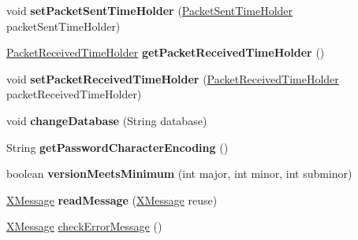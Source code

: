 \begin{DoxyCompactItemize}
void {\bfseries set\+Packet\+Sent\+Time\+Holder} (\mbox{\hyperlink{interfacecom_1_1mysql_1_1cj_1_1protocol_1_1_packet_sent_time_holder}{Packet\+Sent\+Time\+Holder}} packet\+Sent\+Time\+Holder)
\item 
\mbox{\label{classcom_1_1mysql_1_1cj_1_1protocol_1_1x_1_1_x_protocol_a67b0b956239ad6b2a4d455c2b62d0050}} 
\mbox{\hyperlink{interfacecom_1_1mysql_1_1cj_1_1protocol_1_1_packet_received_time_holder}{Packet\+Received\+Time\+Holder}} {\bfseries get\+Packet\+Received\+Time\+Holder} ()
\item 
\mbox{\label{classcom_1_1mysql_1_1cj_1_1protocol_1_1x_1_1_x_protocol_a685b806cae4f1af5e33f7a73fd43d285}} 
void {\bfseries set\+Packet\+Received\+Time\+Holder} (\mbox{\hyperlink{interfacecom_1_1mysql_1_1cj_1_1protocol_1_1_packet_received_time_holder}{Packet\+Received\+Time\+Holder}} packet\+Received\+Time\+Holder)
\item 
\mbox{\label{classcom_1_1mysql_1_1cj_1_1protocol_1_1x_1_1_x_protocol_a0370d4b1edd7b63667381cb3bd6b3085}} 
void {\bfseries change\+Database} (String database)
\item 
\mbox{\label{classcom_1_1mysql_1_1cj_1_1protocol_1_1x_1_1_x_protocol_afb296fd1ce274c0cb1fc920ce64220fe}} 
String {\bfseries get\+Password\+Character\+Encoding} ()
\item 
\mbox{\label{classcom_1_1mysql_1_1cj_1_1protocol_1_1x_1_1_x_protocol_a8895e989b506fa14b82358935c6b34f2}} 
boolean {\bfseries version\+Meets\+Minimum} (int major, int minor, int subminor)
\item 
\mbox{\label{classcom_1_1mysql_1_1cj_1_1protocol_1_1x_1_1_x_protocol_a44f83c9465a2b0d32c040e7e32290506}} 
\mbox{\hyperlink{classcom_1_1mysql_1_1cj_1_1protocol_1_1x_1_1_x_message}{X\+Message}} {\bfseries read\+Message} (\mbox{\hyperlink{classcom_1_1mysql_1_1cj_1_1protocol_1_1x_1_1_x_message}{X\+Message}} reuse)
\item 
\mbox{\hyperlink{classcom_1_1mysql_1_1cj_1_1protocol_1_1x_1_1_x_message}{X\+Message}} \mbox{\hyperlink{classcom_1_1mysql_1_1cj_1_1protocol_1_1x_1_1_x_protocol_a3774ce524cf53d4c5412c0b4d5a3dbda}{check\+Error\+Message}} ()

\end{DoxyCompactItemize}
